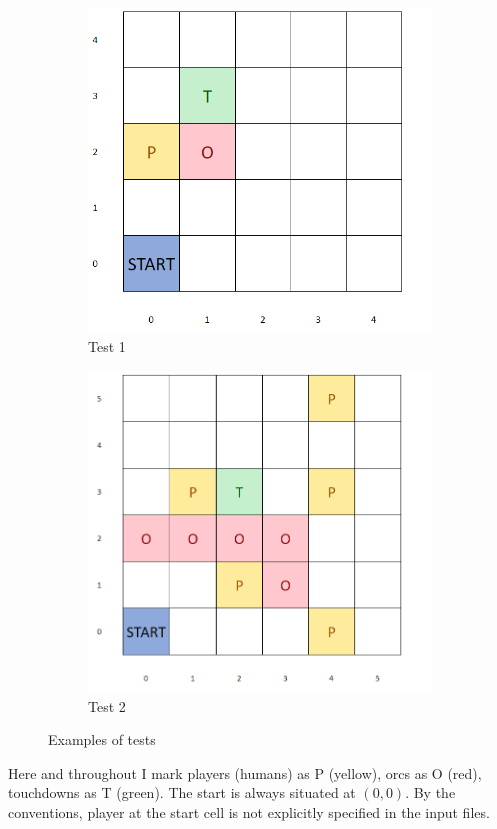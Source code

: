\documentclass{article}
\begin{document}
\begin{figure}[ht]
   	 \centering
     \begin{subfigure}[b]{0.45\textwidth}
         \centering
         \includegraphics[width=\textwidth]{images/image1.png}
         \caption{Test 1}
         \label{fig:test1}
     \end{subfigure}
     \hfill
     \begin{subfigure}[b]{0.45\textwidth}
         \centering
         \includegraphics[width=\textwidth]{images/image2.png}
         \caption{Test 2}
         \label{fig:test2}
     \end{subfigure}
     \caption{Examples of tests}
\end{figure}
Here and throughout I mark players (humans) as P (yellow), orcs as O (red), touchdowns as T (green). The start is always situated at $(0, 0)$. By the conventions, player at the start cell is not explicitly specified in the input files.
\end{document}
